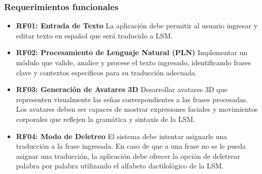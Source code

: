 \subsubsection{Requerimientos funcionales}
\begin{itemize}
    \item \textbf{RF01: Entrada de Texto}  
    La aplicación debe permitir al usuario ingresar y editar texto en español que será traducido a LSM.
    
    \item \textbf{RF02: Procesamiento de Lenguaje Natural (PLN)}  
    Implementar un módulo que valide, analice y procese el texto ingresado, identificando frases clave y contextos específicos para su traducción adecuada.
    
    \item \textbf{RF03: Generación de Avatares 3D}  
    Desarrollar avatares 3D que representen visualmente las señas correspondientes a las frases procesadas. Los avatares deben ser capaces de mostrar expresiones faciales y movimientos corporales que reflejen la gramática y sintaxis de la LSM. 
    
    \item \textbf{RF04: Modo de Deletreo}  
    El sistema debe intentar asignarle una traducción a la frase ingresada. En caso de que a una frase no se le pueda asignar una traducción, la aplicación debe ofrecer la opción de deletrear palabra por palabra utilizando el alfabeto dactilológico de la LSM.
    
    
\end{itemize}



